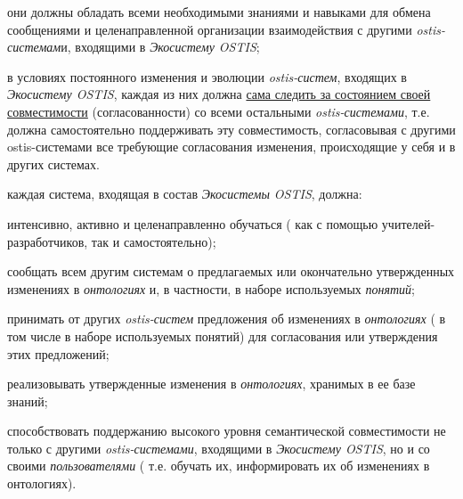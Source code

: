 \begin{SCn}
\begin{scnsubstruct}
{            \begin{scnitemize}
                \item они должны обладать всеми необходимыми знаниями и навыками для обмена сообщениями и целенаправленной организации взаимодействия с другими \textit{ostis-системам}и, входящими в \textit{Экосистему OSTIS};
                \item в условиях постоянного изменения и эволюции \textit{ostis-систем}, входящих в \textit{Экосистему OSTIS}, каждая из них должна \uline{сама следить за состоянием своей совместимости} (согласованности) со всеми остальными \textit{ostis-системами},  т.е. должна самостоятельно поддерживать эту совместимость, согласовывая с другими ostis-системами все требующие согласования изменения, происходящие у себя и в других системах.
                \item каждая система, входящая в состав \textit{Экосистемы OSTIS}, должна:
                \begin{scnitemizeii}
                    \item интенсивно, активно и целенаправленно обучаться ( как с помощью  учителей-разработчиков, так и самостоятельно);
                    \item сообщать всем другим системам о предлагаемых или окончательно утвержденных изменениях в \textit{онтологиях} и, в частности, в наборе используемых \textit{понятий};
                    \item принимать от других \textit{ostis-систем} предложения об изменениях в \textit{онтологиях} ( в том числе в наборе используемых понятий) для согласования или утверждения этих предложений;
                    \item реализовывать утвержденные изменения в \textit{онтологиях}, хранимых в ее базе знаний;
                    \item способствовать поддержанию высокого уровня семантической совместимости не только с другими \textit{ostis-системами}, входящими в \textit{Экосистему OSTIS}, но и со своими \textit{пользователями} ( т.е. обучать их, информировать их об изменениях в онтологиях).
                \end{scnitemizeii}
            \end{scnitemize}
        }

\end{scnsubstruct}
\end{SCn}
